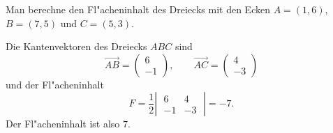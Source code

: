 \begin{beispiel}
Man berechne den Fl"acheninhalt des Dreiecks mit den Ecken
$A=(1,6)$, $B=(7,5)$ und $C=(5,3)$.

\smallskip

{\parindent 0pt Die Kantenvektoren} des Dreiecks $ABC$ sind 
\[
\overrightarrow{AB}=\begin{pmatrix}6\\-1\end{pmatrix}
,\qquad
\overrightarrow{AC}=\begin{pmatrix}4\\-3\end{pmatrix}
\]
und der Fl"acheninhalt
\[
F=\frac12\left|\;\begin{matrix}
   6&  4\\
  -1& -3
\end{matrix}\;\right|=
-7
.
\]
Der Fl"acheninhalt ist also $7$.
\end{beispiel}

